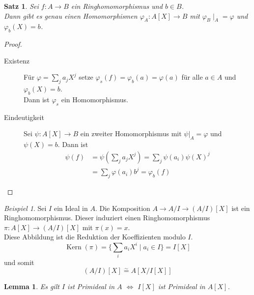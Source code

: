 \documentclass[10pt,a4paper]{article}
\newcommand{\isom}{\overset{\sim}{=}}
\newcommand{\Kern}{\operatorname{Kern}}
\theoremstyle{plain}
\newtheorem{lem}[theorem]{Lemma}
\newtheorem{satz}[theorem]{Satz}
\theoremstyle{definition}
\theoremstyle{remark}
\newtheorem{exm}[theorem]{Beispiel}
\begin{document}
	\begin{satz}
		Sei $f:A\to B$ ein Ringhomomorphismus und $b\in B$. \\
		Dann gibt es genau einen Homomorphismen $\varphi_A:A[X]\to B$ mit $\varphi_B\mid_A=\varphi$ und $\varphi_b(X)=b$.
	\end{satz}

	\begin{proof}
		\begin{description}
			\item[Existenz] Für $\varphi=\sum_j a_jX^j$ setze $\varphi_s(f)=\varphi_b(a)=\varphi(a)$ für alle $a\in A$ und $\varphi_b(X)=b$.\\
			Dann ist $\varphi_s$ ein Homomorphismus.
			\item[Eindeutigkeit] Sei $\psi:A[X]\to B$ ein zweiter Homomorphismus mit $\psi|_A=\varphi$ und $\psi(X)=b$. Dann ist
			\begin{align*}
			\psi(f)&=\psi\left(\sum_ja_jX^j\right)=\sum_j\psi(a_i)\psi(X)^j\\
			&=\sum_j\varphi(a_i)b^j=\varphi_b(f)
			\end{align*}
		\end{description}
	\end{proof}
	
	\begin{exm}
		Sei $I$ ein Ideal in $A$. Die Komposition $A\to A/I\to(A/I)[X]$ ist ein Ringhomomorphismus. Dieser induziert einen Ringhomomorphismus $\pi:A[X]\to(A/I)[X]$ mit $\pi(x)=x$.\\
		Diese Abbildung ist die Reduktion der Koeffizienten modulo $I$.
		\[\Kern(\pi)=\{\sum_ia_iX^i\mid a_i\in I\}=I[X]\]
		und somit
		\[(A/I)[X]\isom A[X/I[X]]\]
	\end{exm}

	\begin{lem}
		Es gilt $I$ ist Primideal in $A$ $\Leftrightarrow$ $I[X]$ ist Primideal in $A[X]$.
	\end{lem}
\end{document}

